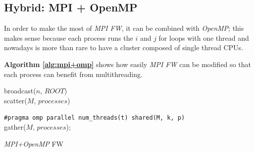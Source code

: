 \subsection{Hybrid: MPI + OpenMP}
In order to make the most of \emph{MPI FW}, it can be combined with \emph{OpenMP}; this
makes sense because each process runs the $i$ and $j$ for loops with one thread and nowadays
is more than rare to have a cluster composed of single thread CPUs.

\textbf{Algorithm \ref*{alg:mpi+omp}} shows how easily \emph{MPI FW} can be modified
so that each process can benefit from multithreading.
\begin{algorithm}[h!]

\SetAlgoLined

broadcast($n$, $ROOT$) \\
scatter($M$, $processes$)

\texttt{\#pragma omp parallel num\_threads(t) shared(M, k, p)} \\
gather($M$, $processes$);
 
\caption{\emph{MPI+OpenMP} FW}\label{alg:mpi+omp}
\end{algorithm}













